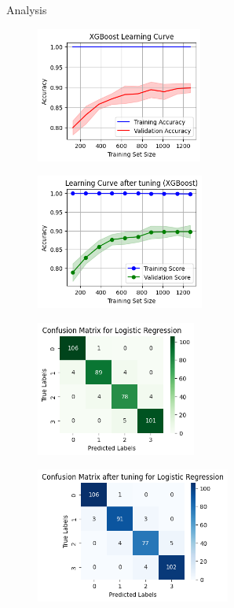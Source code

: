 \documentclass[14pt, aspectratio=169]{beamer}
\begin{document}
\begin{frame}[allowframebreaks]{Analysis}
\begin{adjustwidth}{-0.75cm}{1.25cm}
  \begin{figure}[H]
    \centering
    \begin{minipage}{0.45\textwidth}
        \centering
        \includegraphics[height=12em]{../report/lc_XG.png}
        \label{lc_XG}
    \end{minipage}
    \hfill
    \begin{minipage}{0.45\textwidth}
        \centering
        \includegraphics[height=12em]{../report/lc_tuned_XG.png}
        \label{lc_tuned_XG}
    \end{minipage}
  \end{figure}

  \begin{figure}[H]
    \centering
    \begin{minipage}{0.45\textwidth}
        \centering
        \includegraphics[height=12em]{../report/cmat_LR.png}
        \label{cmat_LR}
    \end{minipage}
    \hfill
    \begin{minipage}{0.45\textwidth}
        \centering
        \includegraphics[height=12em]{../report/cmat_tuned_LR.png}
        \label{cmat_tuned_LR}
    \end{minipage}
\end{figure}


\end{adjustwidth}
\end{frame}
\end{document}
